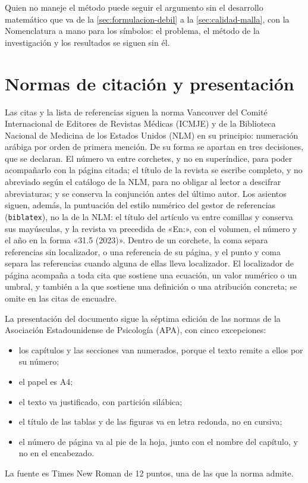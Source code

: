 Quien no maneje el método puede seguir el argumento sin el desarrollo matemático que va de la \autoref{sec:formulacion-debil} a la \autoref{sec:calidad-malla}, con la Nomenclatura a mano para los símbolos: el problema, el método de la investigación y los resultados se siguen sin él.

\section*{Normas de citación y presentación}

Las citas y la lista de referencias siguen la norma Vancouver del Comité Internacional de Editores de Revistas Médicas (ICMJE) y de la Biblioteca Nacional de Medicina de los Estados Unidos (NLM) en su principio: numeración arábiga por orden de primera mención. De su forma se apartan en tres decisiones, que se declaran. El número va entre corchetes, y no en superíndice, para poder acompañarlo con la página citada; el título de la revista se escribe completo, y no abreviado según el catálogo de la NLM, para no obligar al lector a descifrar abreviaturas; y se conserva la conjunción antes del último autor. Los asientos siguen, además, la puntuación del estilo numérico del gestor de referencias (\texttt{biblatex}), no la de la NLM: el título del artículo va entre comillas y conserva sus mayúsculas, y la revista va precedida de «En:», con el volumen, el número y el año en la forma «31.5 (2023)». Dentro de un corchete, la coma separa referencias sin localizador, o una referencia de su página, y el punto y coma separa las referencias cuando alguna de ellas lleva localizador. El localizador de página acompaña a toda cita que sostiene una ecuación, un valor numérico o un umbral, y también a la que sostiene una definición o una atribución concreta; se omite en las citas de encuadre.

La presentación del documento sigue la séptima edición de las normas de la Asociación Estadounidense de Psicología (APA), con cinco excepciones:
\begin{itemize}
    \item los capítulos y las secciones van numerados, porque el texto remite a ellos por su número;
    \item el papel es A4;
    \item el texto va justificado, con partición silábica;
    \item el título de las tablas y de las figuras va en letra redonda, no en cursiva;
    \item el número de página va al pie de la hoja, junto con el nombre del capítulo, y no en el encabezado.
\end{itemize}
La fuente es Times New Roman de 12 puntos, una de las que la norma admite.

